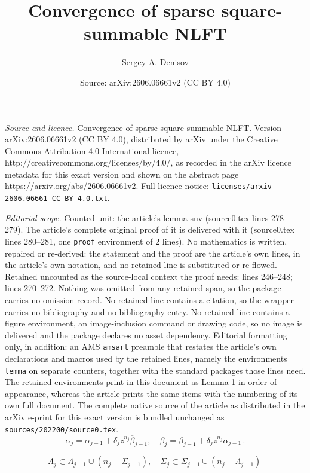 \documentclass[10pt,a4paper]{amsart}
\title{Convergence of sparse square-summable NLFT}
\author{Sergey A. Denisov}
\date{Source: arXiv:2606.06661v2 (CC BY 4.0)}
\begin{document}
\maketitle

\noindent\emph{Source and licence.} Convergence of sparse square-summable NLFT. Version arXiv:2606.06661v2 (CC BY 4.0), distributed by arXiv under the Creative Commons Attribution 4.0 International licence, http://creativecommons.org/licenses/by/4.0/, as recorded in the arXiv licence metadata for this exact version and shown on the abstract page https://arxiv.org/abs/2606.06661v2. Full licence notice: \texttt{licenses/arxiv-2606.06661-CC-BY-4.0.txt}.\par\smallskip

\noindent\textit{Editorial scope.} Counted unit: the article's lemma suv (source0.tex lines 278--279). The article's complete original proof of it is delivered with it (source0.tex lines 280--281, one \texttt{proof} environment of 2 lines). No mathematics is written, repaired or re-derived: the statement and the proof are the article's own lines, in the article's own notation, and no retained line is substituted or re-flowed.  Retained uncounted as the source-local context the proof needs: lines 246--248; lines 270--272.  Nothing was omitted from any retained span, so the package carries no omission record.  No retained line contains a citation, so the wrapper carries no bibliography and no bibliography entry.  No retained line contains a figure environment, an image-inclusion command or drawing code, so no image is delivered and the package declares no asset dependency.  Editorial formatting only, in addition: an AMS \texttt{amsart} preamble that restates the article's own declarations and macros used by the retained lines, namely the environments \texttt{lemma} on separate counters, together with the standard packages those lines need.  The retained environments print in this document as Lemma 1 in order of appearance, whereas the article prints the same items with the numbering of its own full document.  The complete native source of the article as distributed in the arXiv e-print for this exact version is bundled unchanged as \texttt{sources/202200/source0.tex}.
\begin{equation}\label{sd1}
\alpha_{j}=\alpha_{j-1}+{\delta}_j z^{n_j}\overline{\beta}_{j-1}, \quad \beta_{j}=\beta_{j-1}+\delta_j z^{n_j}\overline{\alpha}_{j-1}\,.
\end{equation}

\begin{equation}\label{le}
\Lambda_j\subset \Lambda_{j-1}\cup (n_j-\Sigma_{j-1}), \quad \Sigma_j\subset \Sigma_{j-1}\cup (n_j-\Lambda_{j-1})\,
\end{equation}
\end{document}
